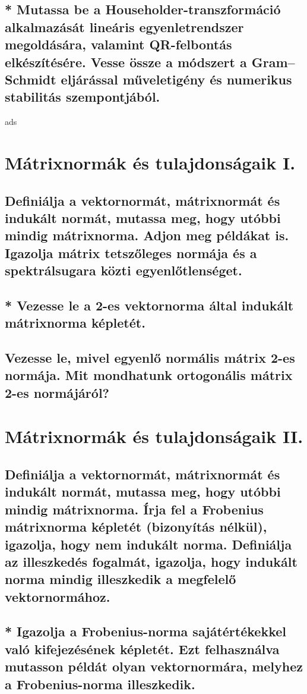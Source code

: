 \documentclass{article}
\begin{document}
        \subsection{* Mutassa be a Householder-transzformáció alkalmazását lineáris egyenletrendszer megoldására, valamint QR-felbontás elkészítésére. Vesse össze a módszert a Gram–Schmidt eljárással műveletigény és numerikus stabilitás szempontjából.}

ads
    \section{Mátrixnormák és tulajdonságaik I.}
        \subsection{Definiálja a vektornormát, mátrixnormát és indukált normát, mutassa meg, hogy utóbbi mindig mátrixnorma. Adjon meg példákat is. Igazolja mátrix tetszőleges normája és a spektrálsugara közti egyenlőtlenséget.}
        \subsection{* Vezesse le a 2-es vektornorma által indukált mátrixnorma képletét.}
        \subsection{Vezesse le, mivel egyenlő normális mátrix 2-es normája. Mit mondhatunk ortogonális mátrix 2-es normájáról?}


    \section{Mátrixnormák és tulajdonságaik II.}
        \subsection{Definiálja a vektornormát, mátrixnormát és indukált normát, mutassa meg, hogy utóbbi mindig mátrixnorma. Írja fel a Frobenius mátrixnorma képletét (bizonyítás nélkül), igazolja, hogy nem indukált norma. Definiálja az illeszkedés fogalmát, igazolja, hogy indukált norma mindig illeszkedik a megfelelő vektornormához.}
        \subsection{* Igazolja a Frobenius-norma sajátértékekkel való kifejezésének képletét. Ezt felhasználva mutasson példát olyan vektornormára, melyhez a Frobenius-norma illeszkedik.}
\end{document}
